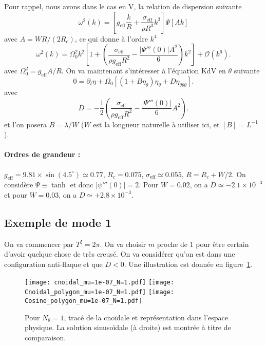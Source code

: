 \documentclass[10pt,a4paper, oneside, fleqn]{myarticle}
\newcommand{\grandO}{\mathscr{O}}
\newcommand{\eff}{_{\mathrm{eff}}}
\begin{document}
Pour rappel, nous avons dans le cas en V, la relation de dispersion suivante
\begin{equation}
  \omega^2(k) = \left[g\eff\frac{k}{R}+\frac{\sigma\eff}{\rho R^3}k^3\right]\Psi\left[A k\right]
\end{equation}
avec $A = W R/(2R_c)$, ce  qui donne à l'ordre $k^4$
\begin{equation}
  \omega^2(k) = \Omega_0^2 k^2 \left[1 +\left(\frac{\sigma\eff}{\rho g\eff R^2} - \frac{|\Psi'''(0)| A^2}{6}\right)k^2\right] + \grandO(k^6).
\end{equation}
avec $\Omega_0^2 = g\eff A/R$.
On va maintenant s'intéresser à l'équation KdV en $\theta$ suivante
\begin{equation}
  0 = \partial_t \eta + \Omega_0 \left[(1+ B \eta_\theta)\eta_\theta +D
    \eta_{\theta\theta\theta}\right].
\end{equation}
avec
\begin{equation}
  D = -\frac{1}{2}\left(\frac{\sigma\eff}{\rho g\eff R^2} - \frac{|\Psi'''(0)|}{6} A^2\right).
\end{equation}
et l'on posera $B = \lambda/W$ ($W$ est la longueur naturelle à utiliser ici, et $[B]=L^{-1}$).
\paragraph{Ordres de grandeur : } $g\eff = 9.81\times\sin(4.5^\circ)\simeq0.77$, $R_c= 0.075$, $\sigma\eff\simeq 0.055$, $R=R_c+W/2$. On considère $\Psi\equiv \tanh$ et donc $|\psi'''(0)|=2$. Pour $W=0.02$, on a $D\simeq -2.1\times 10^{-3}$ et pour $W=0.03$, on a $D\simeq+2.8\times 10^{-3}$.

\clearpage
\subsection{Exemple de mode 1}
On va commencer par $T^\xi=2\pi$. On va choisir $m$ proche de $1$ pour être certain d'avoir quelque chose de très creusé. On va considérer qu'on est dans une configuration anti-flaque et que $D<0$. Une illustration est donnée en figure~\ref{fig_cnoidal_N=1}.

\begin{figure}[ht!]
  \centering
  \texttt{[image: cnoidal\_mu=1e-07\_N=1.pdf]}
  \texttt{[image: Cnoidal\_polygon\_mu=1e-07\_N=1.pdf]}
  \texttt{[image: Cosine\_polygon\_mu=1e-07\_N=1.pdf]}
  \caption{Pour $N_\theta=1$, tracé de la cnoïdale et représentation dans l'espace physique. La solution sinusoïdale (à droite) est montrée à titre de comparaison.}\label{fig_cnoidal_N=1}
\end{figure}
\end{document}
